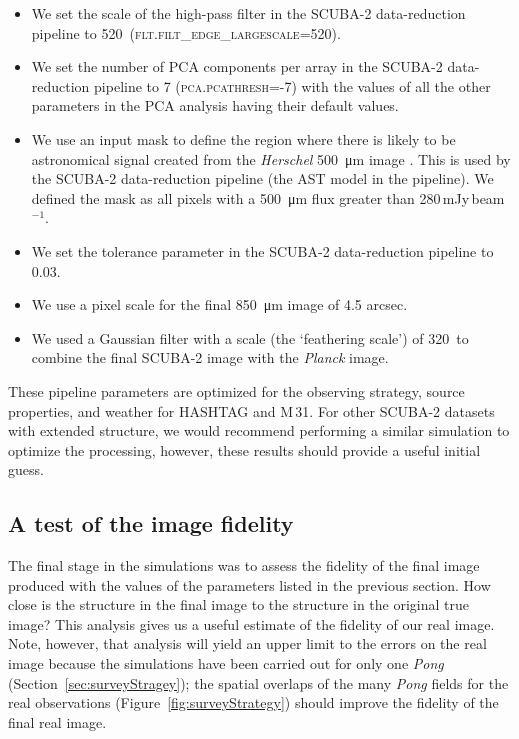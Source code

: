 \documentclass[a4paper,fleqn,usenatbib, twocolumn]{aastex63}
\begin{document}
\begin{itemize}
  \item We set the scale of the
  high-pass filter in the
  SCUBA-2 data-reduction pipeline to
  520\arcsec\ (\textsc{flt.filt\_edge\_largescale}=520).
  
  
  
  \item We set the number of PCA components per array in the SCUBA-2
  data-reduction pipeline to 7 (\textsc{pca.pcathresh}=-7)
  with the values of all the other parameters in the PCA analysis having
  their default values.
  
  \item We use an input mask to define the region where there is likely to be
  astronomical signal created from the {\it Herschel} \SI{500}{\micro\meter} image \citep{smith2012}. This is used by the SCUBA-2 data-reduction pipeline (the AST model in
  the pipeline).
  We defined the mask as all pixels with a \SI{500}{\micro\meter} flux
  greater than
  280\,mJy\,beam$^{-1}$.
  
  \item We set the tolerance parameter in the SCUBA-2 data-reduction pipeline
  to 0.03.
  \item We use a pixel scale for the final \SI{850}{\micro\meter} image of 4.5 arcsec.
  
  \item We used a Gaussian filter with a scale (the `feathering scale') of 320\arcsec\ to combine the final SCUBA-2 image with the {\it Planck} image.
\end{itemize}

These pipeline parameters are optimized for the observing strategy, source properties, and weather for HASHTAG and M\,31. For other
SCUBA-2 datasets with extended structure, we would recommend performing a similar simulation to optimize the processing, however, these results should provide a useful initial guess.  

\subsection{A test of the image fidelity}
\label{sec:faithful}

The final stage in the simulations was to assess the fidelity of the final
image produced with the values of the parameters listed in the previous section.
How close is the structure in the final image to the structure in the original
true image? This analysis gives us a useful estimate of the fidelity of our real image. Note, however, that analysis will yield an upper limit to the errors on
the real image because the simulations have been carried out for
only one {\it Pong} (Section~\ref{sec:surveyStragey}); the spatial overlaps of the many {\it Pong}
fields for the real observations (Figure~\ref{fig:surveyStrategy}) should improve the fidelity
of the final real image.
\end{document}
